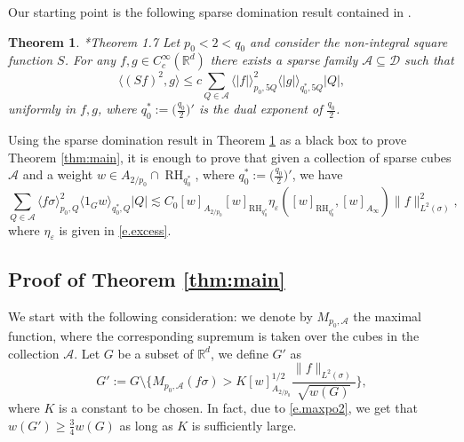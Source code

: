 \documentclass[11pt,reqno]{amsart}
\theoremstyle{plain} %
\newtheorem{theorem}[equation]{Theorem}
\newcommand{\1}{ \mathbbm{1}}   %
\theoremstyle{definition}
\theoremstyle{remark}
\numberwithin{equation}{section}
\begin{document}
Our starting point is the following sparse domination result contained in \cite{BBR}.
\begin{theorem}{\cite{BBR}*{Theorem 1.7}} 
\label{thm:BBR}
Let $p_0<2<q_0$ and consider the non-integral square function $S$. For any $f,g\in C_c^{\infty}(\mathbb{R}^d)$ there exists a sparse family $\mathcal{A}\subseteq \mathcal{D}$ such that
$$
\langle (Sf)^2,g\rangle \le c\sum_{Q\in \mathcal{A}}\langle |f|\rangle_{p_0, 5Q}^2\langle |g|\rangle_{q_0^*, 5Q}|Q|,
$$
uniformly in $f,g$, where $q_0^*:=\big(\frac{q_0}{2}\big)'$ is the dual exponent of $\frac{q_0}{2}$.
\end{theorem}

 Using the sparse domination result in Theorem \ref{thm:BBR} as a black box to prove Theorem \ref{thm:main}, it is enough to prove that given a collection of sparse cubes $\mathcal A$ and a weight $w\in A_{2/p_0}\cap \operatorname{RH}_{q_0^*}$, where $q_0^*:=\big(\frac{q_0}{2}\big)'$, we have 
\begin{equation}\label{e.mainestimateni}
\sum_{Q\in\mathcal A} \langle f \sigma \rangle^2_{p_0,Q} \langle 1_{G}w  \rangle_{q_0^*, Q}|Q| \lesssim C_0 [w]_{A_{2/p_0}} [w]_{ \operatorname{RH}_{q_0^*}}\eta_{\varepsilon} ([w]_{ \operatorname{RH}_{q_0^*}}, [w]_{A_{\infty}}) \|f\|_{L^2(\sigma)}^2,
\end{equation}
where $\eta_{\varepsilon}$ is given in \eqref{e.excess}.


\subsection{Proof of Theorem \ref{thm:main}}
\label{sub:estimate}

We start with the following consideration: we denote by $M_{{p_0}, \mathcal A}$ the maximal function, where the corresponding supremum is taken over the cubes in the collection $\mathcal A$.  Let  $G$ be a subset of $\mathbb R^d$,  we define $G'$ as
\begin{equation}\label{e.choiceofGpo2}
G':=G \setminus \bigg\{M_{{p_0}, \mathcal A}(f \sigma)>K[w]_{A_{2/p_0}}^{1/2}\frac{\|f\|_{L^{2}(\sigma)}}{\sqrt{w(G)}}  \bigg\},
\end{equation}
where $K$ is a constant to be chosen. In fact, due to \eqref{e.maxpo2}, we get that $w(G')\geq \frac{3}{4} w(G)$ as long as $K$ is sufficiently large.
\end{document}
